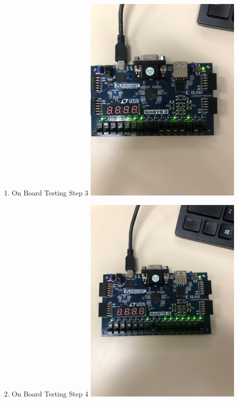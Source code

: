 \documentclass[11pt]{article}
\begin{document}
\begin{enumerate}
\item On Board Testing Step 3 
\includegraphics[width=0.6\textwidth, angle=270]{Lab9.3.jpg} \centering
\label{fig:On Board testing Step 3}

\item On Board Testing Step 4 
\includegraphics[width=0.6\textwidth, angle=270]{Lab9.4.jpg} \centering
\label{fig:On Board testing Step 4}


\end{enumerate}
\end{document}
